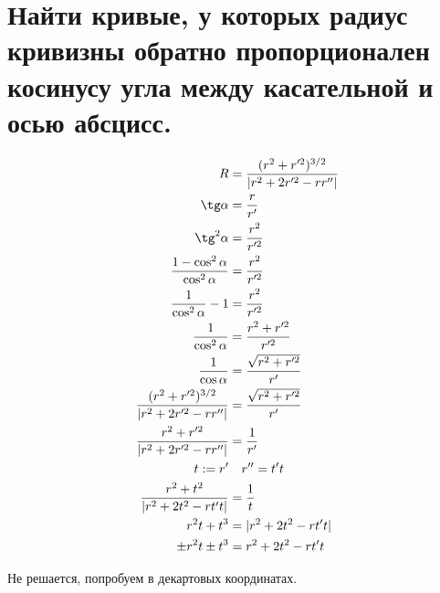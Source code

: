 

\cfoot{}



\section{Найти кривые, у которых радиус кривизны обратно пропорционален косинусу угла между касательной и осью абсцисс.}

\begin{align*}
    R                                             & = \frac{(r^2+r'^2)^{3/2}}{|r^2 + 2r'^2 - rr''|} \\
    \tg \alpha                                    & = \frac{r}{r'}                                  \\
    \tg^2 \alpha                                  & = \frac{r^2}{r'^2}                              \\
    \frac{1 - \cos^2 \alpha}{\cos^2 \alpha}       & = \frac{r^2}{r'^2}                              \\
    \frac{1}{\cos^2 \alpha} - 1                   & = \frac{r^2}{r'^2}                              \\
    \frac{1}{\cos^2 \alpha}                       & = \frac{r^2+r'^2}{r'^2}                         \\
    \frac{1}{\cos \alpha}                         & = \frac{\sqrt{r^2+r'^2}}{r'}                    \\
    \frac{(r^2+r'^2)^{3/2}}{|r^2 + 2r'^2 - rr''|} & = \frac{\sqrt{r^2+r'^2}}{r'}                    \\
    \frac{r^2+r'^2}{|r^2 + 2r'^2 - rr''|}         & = \frac{1}{r'}                                  \\
    t := r'                                       & \quad r'' = t't                                 \\
    \frac{r^2+t^2}{|r^2 + 2t^2 - rt't|}           & = \frac{1}{t}                                   \\
    r^2t+t^3                                      & = |r^2 + 2t^2 - rt't|                           \\
    \pm r^2t\pm t^3                               & = r^2 + 2t^2 - rt't                             \\
\end{align*}

Не решается, попробуем в декартовых координатах.

